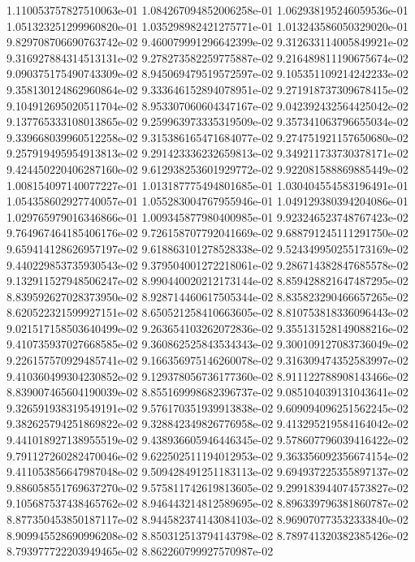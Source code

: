 1.110053757827510063e-01
1.084267094852006258e-01
1.062938195246059536e-01
1.051323251299960820e-01
1.035298982421275771e-01
1.013243586050329020e-01
9.829708706690763742e-02
9.460079991296642399e-02
9.312633114005849921e-02
9.316927884314513131e-02
9.278273582259775887e-02
9.216489811190675674e-02
9.090375175490743309e-02
8.945069479519572597e-02
9.105351109214242233e-02
9.358130124862960864e-02
9.333646152894078951e-02
9.271918737309678415e-02
9.104912695020511704e-02
8.953307060604347167e-02
9.042392432564425042e-02
9.137765333108013865e-02
9.259963973335319509e-02
9.357341063796655034e-02
9.339668039960512258e-02
9.315386165471684077e-02
9.274751921157650680e-02
9.257919495954913813e-02
9.291423336232659813e-02
9.349211733730378171e-02
9.424450220406287160e-02
9.612938253601929772e-02
9.922081588869885449e-02
1.008154097140077227e-01
1.013187775494801685e-01
1.030404554583196491e-01
1.054358602927740057e-01
1.055283004767955946e-01
1.049129380394204086e-01
1.029765979016346866e-01
1.009345877980400985e-01
9.923246523748767423e-02
9.764967464185406176e-02
9.726158707792041669e-02
9.688791245111291750e-02
9.659414128626957197e-02
9.618863101278528338e-02
9.524349950255173169e-02
9.440229853735930543e-02
9.379504001272218061e-02
9.286714382847685578e-02
9.132911527948506247e-02
8.990440020212173144e-02
8.859428821647487295e-02
8.839592627028373950e-02
8.928714460617505344e-02
8.835823290466657265e-02
8.620522321599927151e-02
8.650521258410663605e-02
8.810753818336096443e-02
9.021517158503640499e-02
9.263654103262072836e-02
9.355131528149088216e-02
9.410735937027668585e-02
9.360862525843534343e-02
9.300109127083736049e-02
9.226157570929485741e-02
9.166356975146260078e-02
9.316309474352583997e-02
9.410360499304230852e-02
9.129378056736177360e-02
8.911122788908143466e-02
8.839007465604190039e-02
8.855169998682396737e-02
9.085104039131043641e-02
9.326591938319549191e-02
9.576170351939913838e-02
9.609094096251562245e-02
9.382625794251869822e-02
9.328842349826776958e-02
9.413295219584164042e-02
9.441018927138955519e-02
9.438936605946446345e-02
9.578607796039416422e-02
9.791127260282470046e-02
9.622502511194012953e-02
9.363356092356674154e-02
9.411053856647987048e-02
9.509428491251183113e-02
9.694937225355897137e-02
9.886058551769637270e-02
9.575811742619813605e-02
9.299183944074573827e-02
9.105687537438465762e-02
8.946443214812589695e-02
8.896339796381860787e-02
8.877350453850187117e-02
8.944582374143084103e-02
8.969070773532333840e-02
8.909945528690996208e-02
8.850312513794143798e-02
8.789741320382385426e-02
8.793977722203949465e-02
8.862260799927570987e-02
